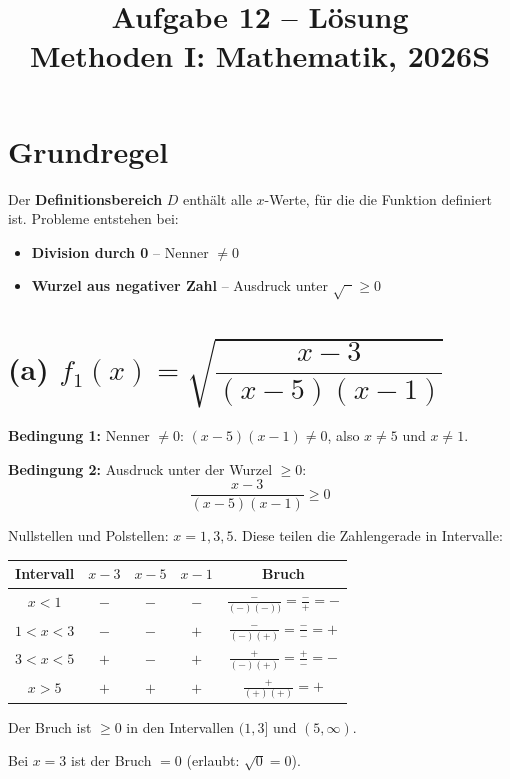 \documentclass[12pt, a4paper]{article}
\title{\textbf{Aufgabe 12 -- Lösung} \\ Methoden I: Mathematik, 2026S}
\author{}
\date{}
\begin{document}
\maketitle

\section*{Grundregel}
Der \textbf{Definitionsbereich} $D$ enthält alle $x$-Werte, für die die Funktion definiert ist. Probleme entstehen bei:
\begin{itemize}
    \item \textbf{Division durch 0} -- Nenner $\neq 0$
    \item \textbf{Wurzel aus negativer Zahl} -- Ausdruck unter $\sqrt{\phantom{x}} \geq 0$
\end{itemize}

\section*{(a) $f_1(x) = \sqrt{\dfrac{x - 3}{(x-5)(x-1)}}$}

\textbf{Bedingung 1:} Nenner $\neq 0$: $(x-5)(x-1) \neq 0$, also $x \neq 5$ und $x \neq 1$.

\textbf{Bedingung 2:} Ausdruck unter der Wurzel $\geq 0$:
\[
    \frac{x - 3}{(x-5)(x-1)} \geq 0
\]

Nullstellen und Polstellen: $x = 1, 3, 5$. Diese teilen die Zahlengerade in Intervalle:

\begin{center}
\begin{tabular}{c|cccc}
    Intervall & $x - 3$ & $x - 5$ & $x - 1$ & Bruch \\
    \hline
    $x < 1$ & $-$ & $-$ & $-$ & $\frac{-}{(-)(-))} = \frac{-}{+} = -$ \\
    $1 < x < 3$ & $-$ & $-$ & $+$ & $\frac{-}{(-)(+)} = \frac{-}{-} = +$ \\
    $3 < x < 5$ & $+$ & $-$ & $+$ & $\frac{+}{(-)(+)} = \frac{+}{-} = -$ \\
    $x > 5$ & $+$ & $+$ & $+$ & $\frac{+}{(+)(+)} = +$
\end{tabular}
\end{center}

Der Bruch ist $\geq 0$ in den Intervallen $(1, 3]$ und $(5, \infty)$.

Bei $x = 3$ ist der Bruch $= 0$ (erlaubt: $\sqrt{0} = 0$).
\end{document}
